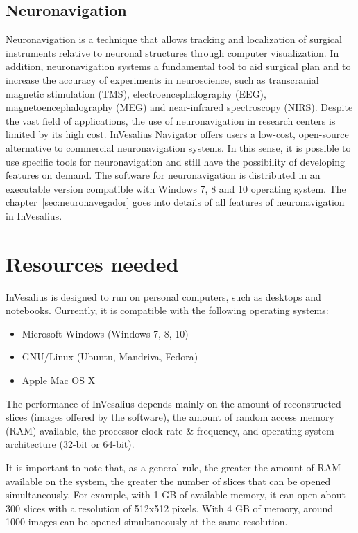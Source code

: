 \subsection{Neuronavigation}
\label{sec:neuronavegador_intro}

Neuronavigation is a technique that allows tracking and localization of surgical instruments relative to neuronal
structures through computer visualization. In addition, neuronavigation systems a fundamental tool to aid surgical plan and to increase the accuracy of experiments in neuroscience, such as transcranial magnetic stimulation (TMS), electroencephalography (EEG), magnetoencephalography (MEG) and near-infrared spectroscopy (NIRS).
Despite the vast field of applications, the use of neuronavigation in research centers is limited by its high cost.
InVesalius Navigator offers users a low-cost, open-source alternative to commercial neuronavigation systems. In this sense, it is possible to use specific tools for
neuronavigation and still have the possibility of developing features on demand. The software for neuronavigation is distributed in an executable version compatible with Windows 7, 8 and 10 operating system. The chapter~\ref{sec:neuronavegador} goes into details of all features of neuronavigation in InVesalius.

\section{Resources needed}

InVesalius is designed to run on personal computers, such as desktops and notebooks. Currently, it is compatible with the following operating systems:

\begin{itemize}
	\item Microsoft Windows (Windows 7, 8, 10)
	\item GNU/Linux (Ubuntu, Mandriva, Fedora) 
	\item Apple Mac OS X
\end{itemize}

The performance of InVesalius depends mainly on the amount of reconstructed slices (images offered by the software), the amount of random access memory (RAM) available, the processor clock rate \& frequency, and operating system architecture (32-bit or 64-bit).

It is important to note that, as a general rule, the greater the amount of RAM available on the system, the greater the number of slices that can be opened simultaneously. For example, with 1 GB of available memory, it can open about 300 slices with a resolution of 512x512 pixels. With 4 GB of memory, around 1000 images can be opened simultaneously at the same resolution.

